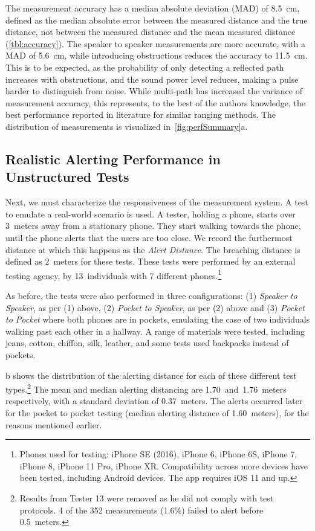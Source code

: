 \documentclass{article}
\begin{document}
The measurement accuracy has a median absolute deviation (MAD) of 8.5~cm, defined as the median absolute error between the measured distance and the true distance, not between the measured distance and the mean measured distance (\cref{tbl:accuracy}). The speaker to speaker measurements are more accurate, with a MAD of 5.6~cm, while introducing obstructions reduces the accuracy to 11.5~cm. This is to be expected, as the probability of only detecting a reflected path increases with obstructions, and the sound power level reduces, making a pulse harder to distinguish from noise. While multi-path has increased the variance of measurement accuracy, this represents, to the best of the authors knowledge, the best performance reported in literature for similar ranging methods. The distribution of measurements is visualized in~\cref{fig:perfSummary}a.


\subsection{Realistic Alerting Performance in Unstructured Tests}

Next, we must characterize the responsiveness of the measurement system. A test to emulate a real-world scenario is used. A tester, holding a phone, starts over 3~meters away from a stationary phone. They start walking towards the phone, until the phone alerts that the users are too close.  We record the furthermost distance at which this happens as the \emph{Alert Distance}. The breaching distance is defined as 2~meters for these tests. These tests were performed by an external testing agency, by 13~individuals with 7 different phones.\footnote{Phones used for testing: iPhone SE (2016), iPhone 6, iPhone 6S, iPhone 7, iPhone 8, iPhone 11 Pro, iPhone XR. Compatibility across more devices have been tested, including Android devices. The app requires iOS 11 and up.}

As before, the tests were also performed in three configurations: (1) \emph{Speaker to Speaker}, as per (1) above, (2) \emph{Pocket to Speaker}, as per (2) above and (3) \emph{Pocket to Pocket} where both phones are in pockets, emulating the case of two individuals walking past each other in a hallway.  A range of materials were tested, including jeans, cotton, chiffon, silk, leather, and some tests used backpacks instead of pockets. 

b shows the distribution of the alerting distance for each of these different test types.\footnote{Results from Tester 13 were removed as he did not comply with test protocols. 4 of the 352 measurements (1.6\%) failed to alert before 0.5~meters.}  The mean and median alerting distancing are 1.70~and~1.76~meters respectively, with a standard deviation of 0.37~meters. The alerts occurred later for the pocket to pocket testing (median alerting distance of 1.60~meters), for the reasons mentioned earlier.
    
\end{document}
